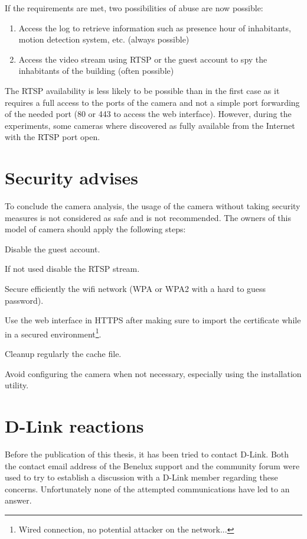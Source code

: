 If the requirements are met, two possibilities of abuse are now possible:
\begin{enumerate}
\item Access the log to retrieve information such as presence hour of inhabitants, motion detection system, etc. (always possible)
\item Access the video stream using RTSP or the guest account to spy the inhabitants of the building (often possible)
\end{enumerate}

The RTSP availability is less likely to be possible than in the first case as it requires a full access to the ports of the camera and not a simple port forwarding of the needed port (80 or 443 to access the web interface).
However, during the experiments, some cameras where discovered as fully available from the Internet with the RTSP port open.

\section{Security advises}
\label{sec:dcs-security}
To conclude the camera analysis, the usage of the camera without taking security measures is not considered as safe and is not recommended.
The owners of this model of camera should apply the following steps:

\begin{itemizealt}
\item Disable the guest account.
\item If not used disable the RTSP stream.
\item Secure efficiently the wifi network (WPA or WPA2 with a hard to guess password).
\item Use the web interface in HTTPS after making sure to import the certificate while in a secured environment\footnote{Wired connection, no potential attacker on the network...}.
\item Cleanup regularly the cache file.
\item Avoid configuring the camera when not necessary, especially using the installation utility.
\end{itemizealt}

\section{D-Link reactions}
\label{sec:dcs-dlink}

Before the publication of this thesis, it has been tried to contact D-Link.
Both the contact email address of the Benelux support and the community forum were used to try to establish a discussion with a D-Link member regarding these concerns.
Unfortunately none of the attempted communications have led to an answer.\\

